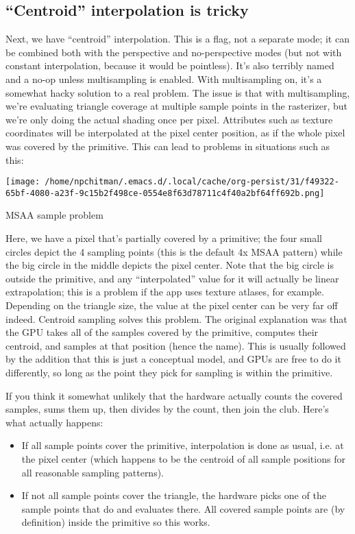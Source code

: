 \documentclass[12pt]{article}
\begin{document}
\subsection{“Centroid” interpolation is tricky}
\label{sec:org3d1ba63}

Next, we have “centroid” interpolation. This is a flag, not a separate mode; it can be combined both with the perspective and no-perspective modes (but not with constant interpolation, because it would be pointless). It’s also terribly named and a no-op unless multisampling is enabled. With multisampling on, it’s a somewhat hacky solution to a real problem. The issue is that with multisampling, we’re evaluating triangle coverage at multiple sample points in the rasterizer, but we’re only doing the actual shading once per pixel. Attributes such as texture coordinates will be interpolated at the pixel center position, as if the whole pixel was covered by the primitive. This can lead to problems in situations such as this:
\begin{center}
\texttt{[image: /home/npchitman/.emacs.d/.local/cache/org-persist/31/f49322-65bf-4080-a23f-9c15b2f498ce-0554e8f63d78711c4f40a2bf64ff692b.png]}
\end{center}
MSAA sample problem

Here, we have a pixel that’s partially covered by a primitive; the four small circles depict the 4 sampling points (this is the default 4x MSAA pattern) while the big circle in the middle depicts the pixel center. Note that the big circle is outside the primitive, and any “interpolated” value for it will actually be linear extrapolation; this is a problem if the app uses texture atlases, for example. Depending on the triangle size, the value at the pixel center can be very far off indeed. Centroid sampling solves this problem. The original explanation was that the GPU takes all of the samples covered by the primitive, computes their centroid, and samples at that position (hence the name). This is usually followed by the addition that this is just a conceptual model, and GPUs are free to do it differently, so long as the point they pick for sampling is within the primitive.

If you think it somewhat unlikely that the hardware actually counts the covered samples, sums them up, then divides by the count, then join the club. Here’s what actually happens:

\begin{itemize}
\item If all sample points cover the primitive, interpolation is done as usual, i.e. at the pixel center (which happens to be the centroid of all sample positions for all reasonable sampling patterns).
\item If not all sample points cover the triangle, the hardware picks one of the sample points that do and evaluates there. All covered sample points are (by definition) inside the primitive so this works.
\end{itemize}
\end{document}
